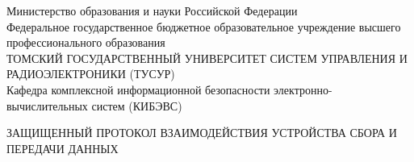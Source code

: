 \newpage
{}

\begin{center}
Министерство образования и науки Российской Федерации\\
Федеральное государственное бюджетное образовательное учреждение высшего профессионального образования\\
ТОМСКИЙ ГОСУДАРСТВЕННЫЙ УНИВЕРСИТЕТ СИСТЕМ УПРАВЛЕНИЯ И РАДИОЭЛЕКТРОНИКИ (ТУСУР)\\
Кафедра комплексной информационной безопасности электронно-вычислительных систем (КИБЭВС)\\
\end{center}



\begin{center}
ЗАЩИЩЕННЫЙ ПРОТОКОЛ ВЗАИМОДЕЙСТВИЯ УСТРОЙСТВА СБОРА И ПЕРЕДАЧИ ДАННЫХ \\
\vspace{0.5cm}
\vspace{4.5cm}
\end{center}

